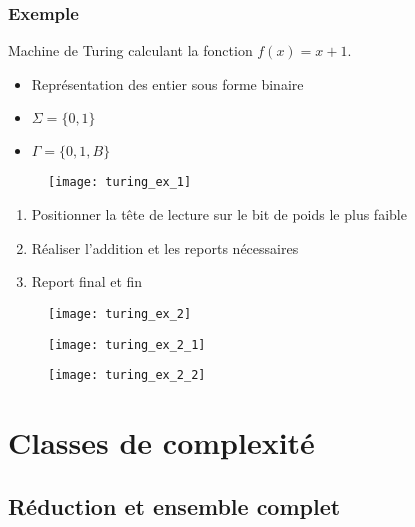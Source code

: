 \subsection{Exemple}

Machine de Turing calculant la fonction $f(x) = x+1$.
\begin{itemize}
\item Représentation des entier sous forme binaire
\item $\Sigma = \{0, 1\}$
\item $\Gamma = \{0, 1, B\}$
\end{itemize}
\begin{figure}[H]
    \centering
    \texttt{[image: turing\_ex\_1]}
\end{figure}
\begin{enumerate}
\item Positionner la tête de lecture sur le bit de poids le plus faible
\item Réaliser l'addition et les reports nécessaires
\item Report final et fin
\end{enumerate}

\begin{minipage}{0.49\textwidth}
	\begin{figure}[H]
		\centering
		\texttt{[image: turing\_ex\_2]}
	\end{figure}
\end{minipage}
\begin{minipage}{0.49\textwidth}
	\begin{figure}[H]
		\centering
		\texttt{[image: turing\_ex\_2\_1]}
	\end{figure}
	\begin{figure}[H]
		\centering
		\texttt{[image: turing\_ex\_2\_2]}
	\end{figure}
\end{minipage}

\chapter{Classes de complexité}

\section{Réduction et ensemble complet}


